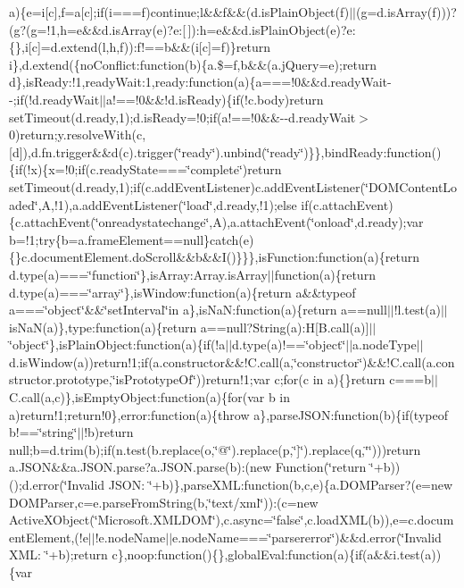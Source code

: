 \begin{DoxyCompactItemize}
a)\{e=i[c],f=a[c];if(i===f)continue;l\&\&f\&\&(d.\-is\-Plain\-Object(f)$|$$|$(g=d.\-is\-Array(f)))?(g?(g=!1,h=e\&\&d.\-is\-Array(e)?e\-:[$\,$])\-:h=e\&\&d.\-is\-Plain\-Object(e)?e\-:\{\},i[c]=d.\-extend(l,h,f))\-:f!==b\&\&(i[c]=f)\}return i\},d.\-extend(\{no\-Conflict\-:function(b)\{a.\$=f,b\&\&(a.\-j\-Query=e);return d\},is\-Ready\-:!1,ready\-Wait\-:1,ready\-:function(a)\{a===!0\&\&d.\-ready\-Wait-\/-\/;if(!d.\-ready\-Wait$|$$|$a!==!0\&\&!d.\-is\-Ready)\{if(!c.\-body)return set\-Timeout(d.\-ready,1);d.\-is\-Ready=!0;if(a!==!0\&\&-\/-\/d.\-ready\-Wait$>$0)return;y.\-resolve\-With(c,[d]),d.\-fn.\-trigger\&\&d(c).\-trigger(\char`\"{}ready\char`\"{}).\-unbind(\char`\"{}ready\char`\"{})\}\},bind\-Ready\-:function()\{if(!x)\{x=!0;if(c.\-ready\-State===\char`\"{}complete\char`\"{})return set\-Timeout(d.\-ready,1);if(c.\-add\-Event\-Listener)c.\-add\-Event\-Listener(\char`\"{}\-D\-O\-M\-Content\-Loaded\char`\"{},\-A,!1),a.\-add\-Event\-Listener(\char`\"{}load\char`\"{},d.\-ready,!1);else if(c.\-attach\-Event)\{c.\-attach\-Event(\char`\"{}onreadystatechange\char`\"{},\-A),a.\-attach\-Event(\char`\"{}onload\char`\"{},d.\-ready);var b=!1;try\{b=a.\-frame\-Element==null\}catch(e)\{\}c.\-document\-Element.\-do\-Scroll\&\&b\&\&\-I()\}\}\},is\-Function\-:function(a)\{return d.\-type(a)===\char`\"{}function\char`\"{}\},is\-Array\-:\-Array.\-is\-Array$|$$|$function(a)\{return d.\-type(a)===\char`\"{}array\char`\"{}\},is\-Window\-:function(a)\{return a\&\&typeof a===\char`\"{}object\char`\"{}\&\&\char`\"{}set\-Interval\char`\"{}in a\},is\-Na\-N\-:function(a)\{return a==null$|$$|$!l.\-test(a)$|$$|$is\-Na\-N(a)\},type\-:function(a)\{return a==null?\-String(a)\-:\-H[\-B.\-call(a)]$|$$|$\char`\"{}object\char`\"{}\},is\-Plain\-Object\-:function(a)\{if(!a$|$$|$d.\-type(a)!==\char`\"{}object\char`\"{}$|$$|$a.\-node\-Type$|$$|$d.\-is\-Window(a))return!1;if(a.\-constructor\&\&!\-C.\-call(a,\char`\"{}constructor\char`\"{})\&\&!\-C.\-call(a.\-constructor.\-prototype,\char`\"{}is\-Prototype\-Of\char`\"{}))return!1;var c;for(c in a)\{\}return c===b$|$$|$\-C.\-call(a,c)\},is\-Empty\-Object\-:function(a)\{for(var b in a)return!1;return!0\},error\-:function(a)\{throw a\},parse\-J\-S\-O\-N\-:function(b)\{if(typeof b!==\char`\"{}string\char`\"{}$|$$|$!b)return null;b=d.\-trim(b);if(n.\-test(b.\-replace(o,\char`\"{}@\char`\"{}).\-replace(p,\char`\"{}]\char`\"{}).\-replace(q,\char`\"{}\char`\"{})))return a.\-J\-S\-O\-N\&\&a.\-J\-S\-O\-N.\-parse?a.\-J\-S\-O\-N.\-parse(b)\-:(new Function(\char`\"{}return \char`\"{}+b))();d.\-error(\char`\"{}\-Invalid J\-S\-O\-N\-: \char`\"{}+b)\},parse\-X\-M\-L\-:function(b,c,e)\{a.\-D\-O\-M\-Parser?(e=new D\-O\-M\-Parser,c=e.\-parse\-From\-String(b,\char`\"{}text/xml\char`\"{}))\-:(c=new Active\-X\-Object(\char`\"{}\-Microsoft.\-X\-M\-L\-D\-O\-M\char`\"{}),c.\-async=\char`\"{}false\char`\"{},c.\-load\-X\-M\-L(b)),e=c.\-document\-Element,(!e$|$$|$!e.\-node\-Name$|$$|$e.\-node\-Name===\char`\"{}parsererror\char`\"{})\&\&d.\-error(\char`\"{}\-Invalid X\-M\-L\-: \char`\"{}+b);return c\},noop\-:function()\{\},global\-Eval\-:function(a)\{if(a\&\&i.\-test(a))\{var 
\end{DoxyCompactItemize}
